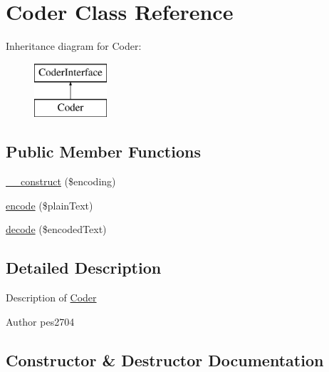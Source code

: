 \hypertarget{class_pes_1_1_security_1_1_coder_1_1_coder}{}\section{Coder Class Reference}
\label{class_pes_1_1_security_1_1_coder_1_1_coder}
Inheritance diagram for Coder\+:\begin{figure}[H]
\begin{center}
\leavevmode
\includegraphics[height=2.000000cm]{class_pes_1_1_security_1_1_coder_1_1_coder}
\end{center}
\end{figure}
\subsection*{Public Member Functions}
\begin{DoxyCompactItemize}
\item 
\mbox{\hyperlink{class_pes_1_1_security_1_1_coder_1_1_coder_a93d0d504908584921e71e17e4bbf0924}{\+\_\+\+\_\+construct}} (\$encoding)
\item 
\mbox{\hyperlink{class_pes_1_1_security_1_1_coder_1_1_coder_a16f142f25f95700f25e05ae0f3b45377}{encode}} (\$plain\+Text)
\item 
\mbox{\hyperlink{class_pes_1_1_security_1_1_coder_1_1_coder_aa4be2a14b7ecb0e18e4fde52012f9a47}{decode}} (\$encoded\+Text)
\end{DoxyCompactItemize}


\subsection{Detailed Description}
Description of \mbox{\hyperlink{class_pes_1_1_security_1_1_coder_1_1_coder}{Coder}}

\begin{DoxyAuthor}{Author}
pes2704 
\end{DoxyAuthor}


\subsection{Constructor \& Destructor Documentation}
\mbox{\label{class_pes_1_1_security_1_1_coder_1_1_coder_a93d0d504908584921e71e17e4bbf0924}} 
